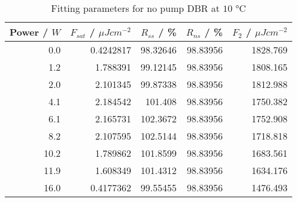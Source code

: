 \begin{table}[H]
\caption{Fitting parameters for no pump DBR at $10$ °C}
\begin{tabular}{rrrrr}
\toprule
Power / $W$ & $F_{sat}$ / $\mu Jcm^{-2}$ & $R_{ss}$ / \% & $R_{ns}$ / \% & $F_2$ / $\mu Jcm^{-2}$ \\
\midrule
0.0 & 0.4242817 & 98.32646 & 98.83956 & 1828.769 \\
1.2 & 1.788391 & 99.12145 & 98.83956 & 1808.165 \\
2.0 & 2.101345 & 99.87338 & 98.83956 & 1812.988 \\
4.1 & 2.184542 & 101.408 & 98.83956 & 1750.382 \\
6.1 & 2.165731 & 102.3672 & 98.83956 & 1752.908 \\
8.2 & 2.107595 & 102.5144 & 98.83956 & 1718.818 \\
10.2 & 1.789862 & 101.8599 & 98.83956 & 1683.561 \\
11.9 & 1.608349 & 101.4312 & 98.83956 & 1634.176 \\
16.0 & 0.4177362 & 99.55455 & 98.83956 & 1476.493 \\
\bottomrule
\end{tabular}
\end{table}
